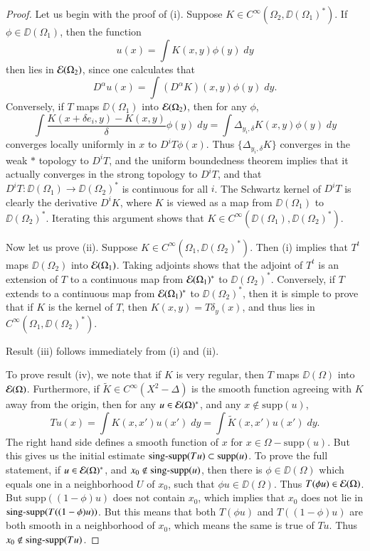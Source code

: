 \begin{proof}
    Let us begin with the proof of (i). Suppose $K \in C^\infty(\Omega_2, \DD(\Omega_1)^*)$. If $\phi \in \DD(\Omega_1)$, then the function
    \[ u(x) = \int K(x,y) \phi(y)\; dy \]
    then lies in $\operatorname{\mathcal{E}}(\Omega_2)$, since one calculates that
    \[ D^\alpha u(x) = \int (D^\alpha K)(x,y) \phi(y)\; dy. \]
    Conversely, if $T$ maps $\DD(\Omega_1)$ into $\operatorname{\mathcal{E}}(\Omega_2)$, then for any $\phi$,
    \[ \int \frac{K(x + \delta e_i ,y) - K(x,y)}{\delta} \phi(y)\; dy = \int \Delta_{y_i,\delta} K(x,y) \phi(y)\; dy \]
    converges locally uniformly in $x$ to $D^i T\phi(x)$. Thus $\{ \Delta_{y_i, \delta} K \}$ converges in the weak $*$ topology to $D^i T$, and the uniform boundedness theorem implies that it actually converges in the strong topology to $D^i T$, and that $D^i T: \DD(\Omega_1) \to \DD(\Omega_2)^*$ is continuous for all $i$. The Schwartz kernel of $D^i T$ is clearly the derivative $D^i K$, where $K$ is viewed as a map from $\DD(\Omega_1)$ to $\DD(\Omega_2)^*$. Iterating this argument shows that $K \in C^\infty(\DD(\Omega_1), \DD(\Omega_2)^*)$.

    Now let us prove (ii). Suppose $K \in C^\infty(\Omega_1, \DD(\Omega_2)^*)$. Then (i) implies that $T^t$ maps $\DD(\Omega_2)$ into $\operatorname{\mathcal{E}}(\Omega_1)$. Taking adjoints shows that the adjoint of $T^t$ is an extension of $T$ to a continuous map from $\operatorname{\mathcal{E}}(\Omega_1)^*$ to $\DD(\Omega_2)^*$. Conversely, if $T$ extends to a continuous map from $\operatorname{\mathcal{E}}(\Omega_1)^*$ to $\DD(\Omega_2)^*$, then it is simple to prove that if $K$ is the kernel of $T$, then $K(x,y) = T \delta_y(x)$, and thus lies in $C^\infty(\Omega_1, \DD(\Omega_2)^*)$.

    Result (iii) follows immediately from (i) and (ii).

    To prove result (iv), we note that if $K$ is very regular, then $T$ maps $\DD(\Omega)$ into $\operatorname{\mathcal{E}}(\Omega)$. Furthermore, if $\tilde{K} \in C^\infty(X^2 - \Delta)$ is the smooth function agreeing with $K$ away from the origin, then for any $u \in \operatorname{\mathcal{E}}(\Omega)^*$, and any $x \not \in \text{supp}(u)$,
    \[ Tu(x) = \int K(x,x') u(x')\; dy = \int \tilde{K}(x,x') u(x')\; dy. \]
    The right hand side defines a smooth function of $x$ for $x \in \Omega - \text{supp}(u)$. But this gives us the initial estimate $\operatorname{\text{sing-supp}}(Tu) \subset \text{supp}(u)$. To prove the full statement, if $u \in \operatorname{\mathcal{E}}(\Omega)^*$, and $x_0 \not \in \operatorname{\text{sing-supp}}(u)$, then there is $\phi \in \DD(\Omega)$ which equals one in a neighborhood $U$ of $x_0$, such that $\phi u \in \DD(\Omega)$. Thus $T(\phi u) \in \operatorname{\mathcal{E}}(\Omega)$. But $\text{supp}((1 - \phi) u)$ does not contain $x_0$, which implies that $x_0$ does not lie in $\operatorname{\text{sing-supp}}(T((1 - \phi)u))$. But this means that both $T(\phi u)$ and $T((1 - \phi)u)$ are both smooth in a neighborhood of $x_0$, which means the same is true of $Tu$. Thus $x_0 \not \in \operatorname{\text{sing-supp}}(Tu)$.


\end{proof}
